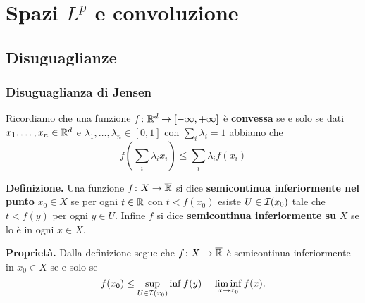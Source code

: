 %
%

\chapter{Spazi $L^p$ e convoluzione}

\section{Disuguaglianze}

\subsection{Disuguaglianza di Jensen}

Ricordiamo che una funzione $f \colon \mathbb R^d \to [-\infty, +\infty]$ è \textbf{convessa} se e solo se dati $x_1, \dots, x_n \in \mathbb R^d$ e $\lambda_1, \dots, \lambda_n \in [0, 1]$ con $\sum_i \lambda_i = 1$ abbiamo che
$$
	f \left(\sum_i \lambda_i x_i \right) \leq \sum_i \lambda_i f(x_i)
$$

\textbf{Definizione.} Una funzione $f \colon X \to \overline{\mathbb R}$ si dice \textbf{semicontinua inferiormente nel punto} $x_0 \in X$ se per ogni $t \in \mathbb R$ con $t < f(x_0)$ esiste $U \in \mathcal{I}(x_0)$ tale che $t < f(y)$ per ogni $y \in U$. Infine $f$ si dice \textbf{semicontinua inferiormente su} $X$ se lo è in ogni $x \in X$.

\textbf{Proprietà.} Dalla definizione segue che $f \colon X \to \overline{\mathbb R}$ è semicontinua inferiormente in $x_0 \in X$ se e solo se
$$
	f(x_0) \leq \sup_{U \in \mathcal{I}(x_0)} \inf f(y) = \liminf_{x \to x_0} f(x).
$$


